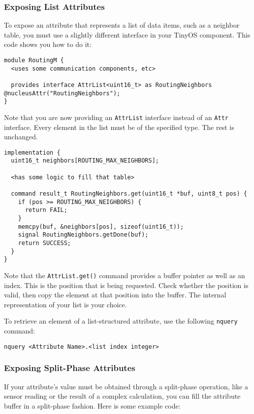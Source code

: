 \documentclass{article}
\begin{document}
\subsubsection{Exposing List Attributes}

To expose an attribute that represents a list of data items, such as a
neighbor table, you must use a slightly different interface in your
TinyOS component. This code shows you how to do it:

\begin{verbatim}
module RoutingM {
  <uses some communication components, etc>

  provides interface AttrList<uint16_t> as RoutingNeighbors @nucleusAttr("RoutingNeighbors");
}
\end{verbatim}

Note that you are now providing an {\tt AttrList} interface instead of
an {\tt Attr} interface. Every element in the list must be of the
specified type. The rest is unchanged.

\begin{verbatim}
implementation {
  uint16_t neighbors[ROUTING_MAX_NEIGHBORS];

  <has some logic to fill that table>

  command result_t RoutingNeighbors.get(uint16_t *buf, uint8_t pos) {
    if (pos >= ROUTING_MAX_NEIGHBORS) {
      return FAIL;
    }
    memcpy(buf, &neighbors[pos], sizeof(uint16_t));
    signal RoutingNeighbors.getDone(buf);
    return SUCCESS;
  }
}
\end{verbatim}

Note that the {\tt AttrList.get()} command provides a buffer pointer
as well as an index. This is the position that is being
requested. Check whether the position is valid, then copy the element
at that position into the buffer. The internal representation of your
list is your choice.

To retrieve an element of a list-structured attribute, use the
following {\tt nquery} command:

\begin{verbatim}
nquery <Attribute Name>.<list index integer>
\end{verbatim}

\subsubsection{Exposing Split-Phase Attributes}

If your attribute's value must be obtained through a split-phase
operation, like a sensor reading or the result of a complex
calculation, you can fill the attribute buffer in a split-phase
fashion. Here is some example code:
\end{document}
